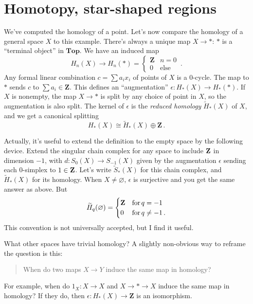 \section{Homotopy, star-shaped regions}

We've computed the homology of a point. Let's now compare the homology of
a general space $X$ to this example. There's always a unique map $X\to\ast$: $\ast$ is a ``terminal object'' in $\mathbf{Top}$. We have an induced map 
\[ 
H_n(X)\to H_n(\ast)=
\begin{cases}\mathbf{Z} & n=0\\
0 & \text{else}\end{cases}\,.
\]
Any formal linear combination $c=\sum a_i x_i$ of points of $X$ is a 0-cycle. 
The map to $\ast$ sends $c$ to $\sum a_i\in\mathbf{Z}$. This defines
an ``augmentation'' $\epsilon:H_*(X)\to H_*(\ast)$. 
If $X$ is nonempty, the map $X\to\ast$ is split by any choice of point in $X$,
so the augmentation is also split. The kernel of $\epsilon$ is the 
{\em reduced homology} $\widetilde H_*(X)$ of $X$, and we get a canonical 
splitting 
\[
H_*(X)\cong \widetilde H_*(X)\oplus\mathbf{Z}\,.
\]

Actually, it's useful to extend the definition to the empty space by the
following device. Extend the singular chain complex for any space to include 
$\mathbf Z$ in dimension $-1$, with $d:S_0(X)\to S_{-1}(X)$ given by the 
augmentation $\epsilon$ sending each $0$-simplex to $1\in\mathbf Z$. 
Let's write $\widetilde S_*(X)$ for this chain 
complex, and $\widetilde H_*(X)$ for its homology. 
When $X\neq\varnothing$, $\epsilon$ is surjective
and you get the same answer as above. But 
\[
\widetilde H_q(\varnothing)=
\begin{cases}\mathbf{Z} & \hbox{for}\,q=-1\\0 & \hbox{for}\,q\neq-1\,.
\end{cases}
\]
This convention is not universally accepted, but I find it useful.

What other spaces have trivial homology? A slightly non-obvious way to reframe
the question is this:
\begin{quote}
When do two maps $X\to Y$ induce the same map in homology? 
\end{quote}
For example,
when do $1_X:X\to X$ and $X\to\ast\to X$ induce the same map in homology?
If they do, then $\epsilon:H_*(X)\to\mathbf{Z}$ is an isomorphism. 


